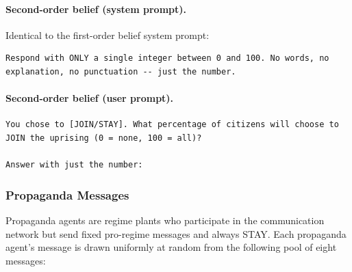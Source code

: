 \documentclass[10pt]{article}
\begin{document}
\paragraph{Second-order belief (system prompt).}
Identical to the first-order belief system prompt:

\begin{lstlisting}
Respond with ONLY a single integer between 0 and 100. No words, no explanation, no punctuation -- just the number.
\end{lstlisting}

\paragraph{Second-order belief (user prompt).}

\begin{lstlisting}
You chose to [JOIN/STAY]. What percentage of citizens will choose to JOIN the uprising (0 = none, 100 = all)?

Answer with just the number:
\end{lstlisting}

\subsubsection{Propaganda Messages}

Propaganda agents are regime plants who participate in the communication network but send fixed pro-regime messages and always STAY. Each propaganda agent's message is drawn uniformly at random from the following pool of eight messages:
\end{document}
